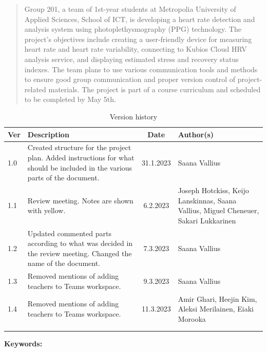 \documentclass{article}
\begin{document}
\newpage

\begin{abstract}
Group 201, a team of 1st-year students at Metropolia University of Applied Sciences, School of ICT, is developing a heart rate detection and analysis system using photoplethysmography (PPG) technology. The project's objectives include creating a user-friendly device for measuring heart rate and heart rate variability, connecting to Kubios Cloud HRV analysis service, and displaying estimated stress and recovery status indexes. The team plans to use various communication tools and methods to ensure good group communication and proper version control of project-related materials. The project is part of a course curriculum and scheduled to be completed by May 5th.
\end{abstract}





\vspace{1cm}

\begin{table}[h]
\centering
\begin{tabular}{|p{1cm}|p{5cm}|c|p{3.5cm}|}
\hline
\textbf{Ver} & \textbf{Description} & \textbf{Date} & \textbf{Author(s)} \\ \hline
1.0 & Created structure for the project plan. Added instructions for what should be included in the various parts of the document.   & 31.1.2023 & Saana Vallius \\ \hline
1.1 & Review meeting. Notes are shown with yellow.  & 6.2.2023 & Joseph Hotckiss,  Keijo Lanskinnas, Saana Vallius, Miguel Cheneuer, Sakari Lukkarinen \\ \hline
1.2 & Updated commented parts according to what was decided in the review meeting. Changed the name of the document. & 7.3.2023 & Saana Vallius \\ \hline
1.3 &  Removed mentions of adding teachers to Teams workspace. & 9.3.2023 & Saana Vallius \\ \hline
1.4 &  Removed mentions of adding teachers to Teams workspace. & 11.3.2023 & Amir Ghari, Heejin Kim, Aleksi Merilainen, Eiaki Morooka \\ \hline
 &  &  &  \\ \hline
 &  &  &  \\ \hline
\end{tabular}
\caption{Version history}
\label{table:version-history}
\end{table}

\begin{center}
\textbf{\large Keywords:}
\end{center}
\begin{bf}
\begin{center}
\end{center}
\end{bf}
\end{document}
